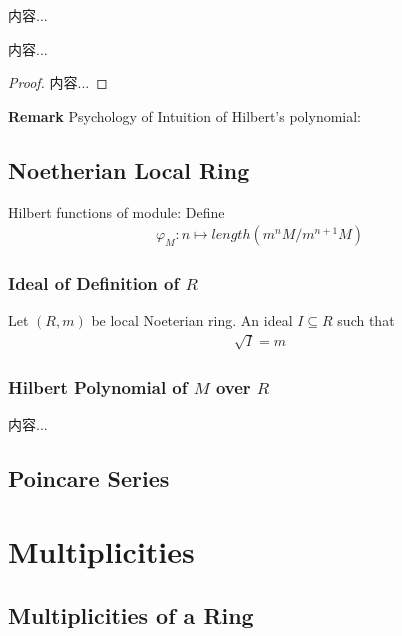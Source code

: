 \documentclass[Total.tex]{subfiles}
\begin{document}
				\begin{Def}
					内容...
				\end{Def}
				
				\begin{proposition}
					内容...
				\end{proposition}
				\begin{proof}
					内容...
				\end{proof}
				
				\textbf{Remark} Psychology of Intuition of Hilbert's polynomial: 
			\section{Noetherian Local Ring}\label{Commutative-Algebra-Hilbert-Polynomials-Noetherian-Local-Ring}
				\begin{Def}
				Hilbert functions of module: Define
				\begin{gather*}
					\varphi_M:n\mapsto length(m^nM/m^{n+1}M)
				\end{gather*}
			\end{Def}
			\subsection{Ideal of Definition of $R$}
				\begin{Def}
					\label{Commutative-Algebra-Ideal-of-Definition}Let $(R,m)$ be local Noeterian ring. An ideal $I\subseteq R$ such that
					\begin{gather*}
						\sqrt{I}=m
					\end{gather*}
				\end{Def}
			\subsection{Hilbert Polynomial of $M$ over $R$}
				\begin{Def}
					内容...
				\end{Def}
		\section{Poincare Series}
	\chapter{Multiplicities}
		\section{Multiplicities of a Ring}
\end{document}
